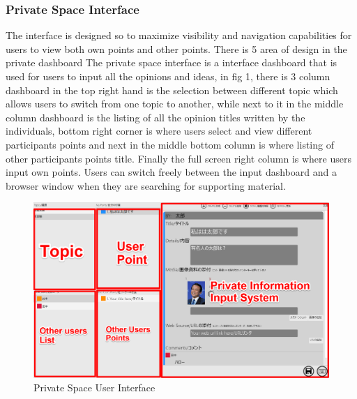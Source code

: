 \documentclass{sigchi}
\begin{document}
\subsubsection{Private Space Interface}
The interface  is designed so to maximize visibility and navigation capabilities for users to view both own points and other points. There is 5 area of design in the private dashboard The private space interface is a interface dashboard that is used for users to input all the opinions and ideas, in fig 1, there is 3 column dashboard in the top right hand is the selection between different topic which allows users to switch from one topic to another, while next to it in the middle column dashboard is the listing of all the opinion titles written by the individuals, bottom right corner is where users select and view different participants points and next in the middle bottom column is where listing of other participants points title. Finally the full screen right column is where users input own points. Users can switch freely between the input dashboard and a browser window when they are searching for supporting material.
\begin{figure}
\centering
\includegraphics[width=1.0\columnwidth]{private}
\caption{Private Space User Interface}
\label{fig:figure1}
\end{figure}
\end{document}
